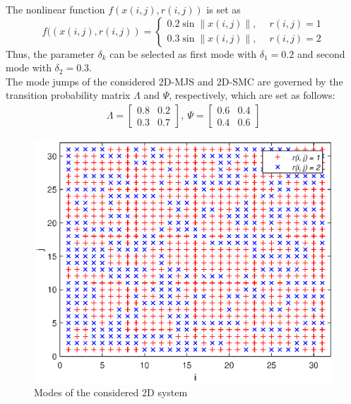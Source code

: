 \documentclass[journal,final,twocolumn]{IEEEtran}
\begin{document}
The nonlinear function $f(x(i,j),r(i,j))$ is set as
\begin{equation*}
	f((x(i,j),r(i,j)) = \begin{cases}
	0.2\sin{ \|x(i,j)\|}, \quad \ r(i,j)=1\\
	0.3\sin{ \|x(i,j)\|}, \quad \ r(i,j)=2
	\end{cases}
\end{equation*}
Thus, the parameter $\delta_{k}$ can be selected as first mode with $\delta_{1}=0.2$  and  second mode with $\delta_{2}=0.3$.\\
The mode jumps of the considered 2D-MJS and 2D-SMC are governed by the transition probability matrix  $\varLambda$ and $\varPsi$, respectively, which are set as follows:
\begin{equation*}
\begin{aligned}
	\varLambda=\begin{bmatrix}
	0.8&0.2\\ 0.3&0.7
	\end{bmatrix}, \ 
	\varPsi = \begin{bmatrix}
	0.6&0.4\\ 0.4 &0.6
	\end{bmatrix}
\end{aligned}
\end{equation*}
\begin{figure}[!htb]
	\centering\includegraphics[scale=0.6]{./simulations/r_eps.eps}
	\caption{Modes of the considered  2D system}
	\label{fig1}
\end{figure}
\end{document}
